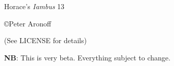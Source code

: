 \begin{titlepage}

\begin{center}

\huge Horace's \textit{Iambus} 13

\vskip2in

\large \copyright Peter Aronoff \the\year

(See LICENSE for details)

\vskip1in

\textbf{NB}: This is very beta. Everything subject to change.

\vskip2in

\newpage

\end{center}

\end{titlepage}
